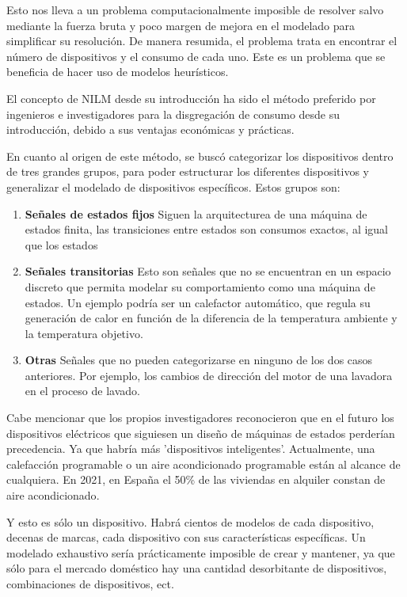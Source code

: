 Esto nos lleva a un problema computacionalmente imposible de resolver salvo mediante la fuerza bruta\autocite[4]{192069} y poco margen de mejora en el modelado para simplificar su resolución. De manera resumida, el problema trata en encontrar el número de dispositivos y el consumo de cada uno. 
Este es un problema que se beneficia de hacer uso de modelos heurísticos.

El concepto de NILM desde su introducción ha sido el método preferido por ingenieros e investigadores para la disgregación de consumo desde su introducción, debido a sus ventajas económicas y prácticas.\autocite[pág. 2, pár. 4]{Nalmpantis2019}

En cuanto al origen de este método, se buscó categorizar los dispositivos dentro de tres grandes grupos, para poder estructurar los diferentes dispositivos y generalizar el modelado de dispositivos específicos. 
Estos grupos son: 

\begin{enumerate}
\item \textbf{Señales de estados fijos} Siguen la arquitecturea de una máquina de estados finita, las transiciones entre estados son consumos exactos, al igual que los estados
\item \textbf{Señales transitorias} Esto son señales que no se encuentran en un espacio discreto que permita modelar su comportamiento como una máquina de estados. Un ejemplo podría ser un calefactor automático, que regula su generación de calor en función de la diferencia de la temperatura ambiente y la temperatura objetivo.
\item \textbf{Otras} Señales que no pueden categorizarse en ninguno de los dos casos anteriores. Por ejemplo, los cambios de dirección del motor de una lavadora en el proceso de lavado. 
\end{enumerate}

Cabe mencionar que los propios investigadores reconocieron que en el futuro los dispositivos eléctricos que siguiesen un diseño de máquinas de estados perderían precedencia. Ya que habría más 'dispositivos inteligentes'. Actualmente, una calefacción programable o un aire acondicionado programable están al alcance de cualquiera.
En 2021, en España el 50\% de las viviendas en alquiler constan de aire acondicionado\autocite{idealista2021}. 

Y esto es sólo un dispositivo. Habrá cientos de modelos de cada dispositivo, decenas de marcas, cada dispositivo con sus características específicas. 
Un modelado exhaustivo sería prácticamente imposible de crear y mantener, ya que sólo para el mercado doméstico hay una cantidad desorbitante de dispositivos, combinaciones de dispositivos, ect.


